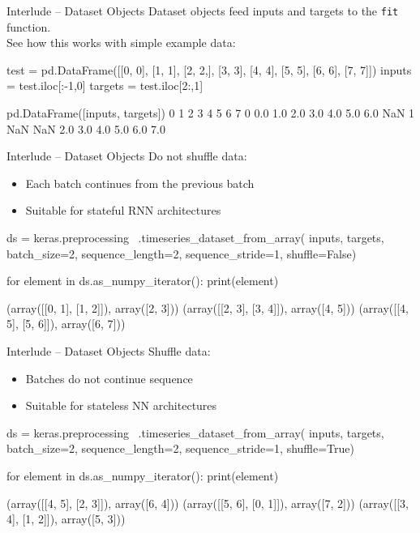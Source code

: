 \documentclass[ignorenonframetext,xcolor=x11names]{beamer}
\begin{document}
\begin{frame}[label=withcode,fragile]{Interlude -- Dataset Objects}
Dataset objects feed inputs and targets to the \texttt{fit} function. \\

See how this works with simple example data:
\begin{pythoncode}
test = pd.DataFrame([[0, 0], [1, 1], [2, 2,], [3, 3], 
                     [4, 4], [5, 5], [6, 6], [7, 7]]) 
inputs = test.iloc[:-1,0]
targets = test.iloc[2:,1]

pd.DataFrame([inputs, targets])
     0    1    2    3    4    5    6    7
0  0.0  1.0  2.0  3.0  4.0  5.0  6.0  NaN
1  NaN  NaN  2.0  3.0  4.0  5.0  6.0  7.0
\end{pythoncode}
\end{frame}

\begin{frame}[label=withcode,fragile]{Interlude -- Dataset Objects}
Do not shuffle data:
\begin{itemize}
    \item Each batch continues from the previous batch
    \item Suitable for stateful RNN architectures
\end{itemize}

\begin{pythoncode}
ds = keras.preprocessing \
    .timeseries_dataset_from_array(
        inputs, 
        targets,
        batch_size=2, 
        sequence_length=2,
        sequence_stride=1, 
        shuffle=False)
        
for element in ds.as_numpy_iterator():
     print(element)

(array([[0, 1],
       [1, 2]]), array([2, 3]))
(array([[2, 3],
       [3, 4]]), array([4, 5]))
(array([[4, 5],
       [5, 6]]), array([6, 7]))
\end{pythoncode}
\end{frame}

\begin{frame}[label=withcode,fragile]{Interlude -- Dataset Objects}
Shuffle data:
\begin{itemize}
    \item Batches do not continue sequence
    \item Suitable for stateless NN architectures
\end{itemize}

\begin{pythoncode}
ds = keras.preprocessing \
    .timeseries_dataset_from_array(
        inputs, 
        targets,
        batch_size=2, 
        sequence_length=2,
        sequence_stride=1, 
        shuffle=True)
        
for element in ds.as_numpy_iterator():
     print(element)

(array([[4, 5],
       [2, 3]]), array([6, 4]))
(array([[5, 6],
       [0, 1]]), array([7, 2]))
(array([[3, 4],
       [1, 2]]), array([5, 3]))
\end{pythoncode}
\end{frame}
\end{document}

